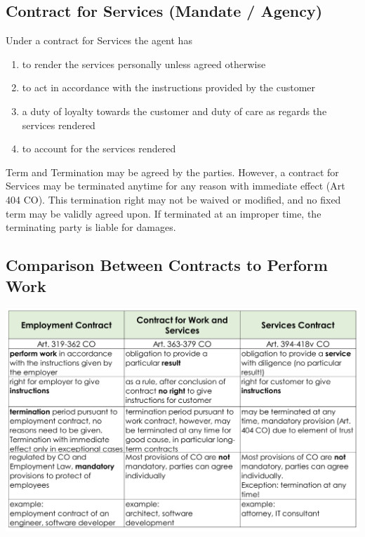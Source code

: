 \documentclass[11pt]{article}
\theoremstyle{definition}
\begin{document}
\subsection{Contract for Services (Mandate / Agency)}
Under a contract for Services the agent has
\begin{enumerate}
	\item to render the services personally unless agreed otherwise
	\item to act in accordance with the instructions provided by the customer
	\item a duty of loyalty towards the customer and duty of care as regards the services rendered
	\item to account for the services rendered
\end{enumerate}
Term and Termination may be agreed by the parties. However, a contract for Services may be terminated anytime for any reason with immediate effect (Art 404 CO). This termination right may not be waived or modified, and no fixed term may be validly agreed upon. If terminated at an improper time, the terminating party is liable for damages.

\subsection{Comparison Between Contracts to Perform Work}
\begin{center}
	\includegraphics[width=0.9\linewidth]{img/comparison_contracts_work}
\end{center}
\end{document}
